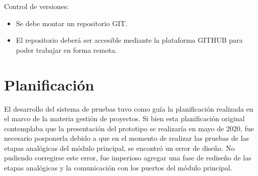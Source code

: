 Control de versiones:

\begin{itemize}
	\item Se debe montar un repositorio GIT.
	\item El repositorio deberá ser accesible mediante la plataforma GITHUB para poder trabajar en forma remota.
\end{itemize}

\section{Planificación}
El desarrollo del sistema de pruebas tuvo como guía la planificación realizada en el marco de la materia gestión de proyectos. Si bien esta planificación original contemplaba que la presentación del prototipo se realizaría en mayo de 2020, fue necesario posponerla debido a que en el momento de realizar las pruebas de las etapas analógicas del módulo principal, se encontró un error de diseño. No pudiendo corregirse este error, fue imperioso agregar una fase de rediseño de las etapas analógicas y la comunicación con los puertos del módulo principal.

